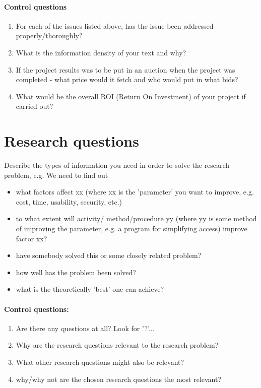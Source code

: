 \documentclass[informationsecurity]{gucmasterproject}
\begin{document}
\paragraph{Control questions}
\begin{enumerate}
\item For each of the issues listed above, has the issue been addressed properly/thoroughly? 
\item What is the information density of your text and why?
\item If the project results was to be put in an auction when the project was completed - what price would it fetch and who would put in what bids? 
\item What would be the overall ROI (Return On Investment) of your project if carried out?
\end{enumerate}

\section{Research questions}\label{research:questions}
Describe the types of information you need in order to solve the research problem, e.g.
We need to find out
\begin{itemize}
\item what factors affect  xx (where xx is the 'parameter' you want to improve, e.g. cost, time, usability, security, etc.)
\item to what extent will activity/ method/procedure yy (where yy is some method of improving the parameter, e.g.  a program for simplifying access) improve factor xx?
\item have somebody solved this or some closely related problem?
\item how well has the problem been solved?
\item what is the theoretically 'best' one can achieve?
\end{itemize}

\paragraph{Control questions:}
\begin{enumerate}
\item Are there any questions at all? Look for '?'...
\item Why are the research questions relevant to the research problem?
\item What other research questions might also be relevant?
\item why/why not are the chosen research questions the most relevant?
\end{enumerate}
\end{document}
